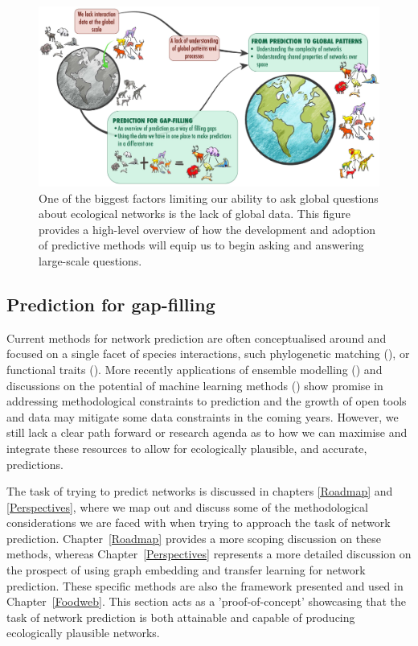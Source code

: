 \begin{refsection}
\begin{figure}[h]
    \centering
    \includegraphics[width=\textwidth]{figures/thesis-flowchart.jpg}
    \caption{One of the biggest factors limiting our ability to ask global questions about ecological networks is the lack of global data. This figure provides a high-level overview of how the development and adoption of predictive methods will equip us to begin asking and answering large-scale questions.}
    \label{fig:plan}
\end{figure}

\subsection{Prediction for gap-filling}

Current methods for network prediction are often conceptualised around and focused on a single facet of species interactions, such phylogenetic matching (\cite{Pomeranz2018InfPre, Elmasri2020HieBay}), or functional traits (\cite{Bartomeus2016ComFra}). More recently applications of ensemble modelling (\cite{Becker2020PreWil}) and discussions on the potential of machine learning methods (\cite{Desjardins-Proulx2019ArtInt}) show promise in addressing methodological constraints to prediction and the growth of open tools and data may mitigate some data constraints in the coming years. However, we still lack a clear path forward or research agenda as to how we can maximise and integrate these resources to allow for ecologically plausible, and accurate, predictions.

The task of trying to predict networks is discussed in chapters \ref{Roadmap} and \ref{Perspectives}, where we map out and discuss some of the methodological considerations we are faced with when trying to approach the task of network prediction. Chapter~\ref{Roadmap} provides a more scoping discussion on these methods, whereas Chapter~\ref{Perspectives} represents a more detailed discussion on the prospect of using graph embedding and transfer learning for network prediction. These specific methods are also the framework presented and used in Chapter~\ref{Foodweb}. This section acts as a 'proof-of-concept' showcasing that the task of network prediction is both attainable and capable of producing ecologically plausible networks.


\end{refsection}
